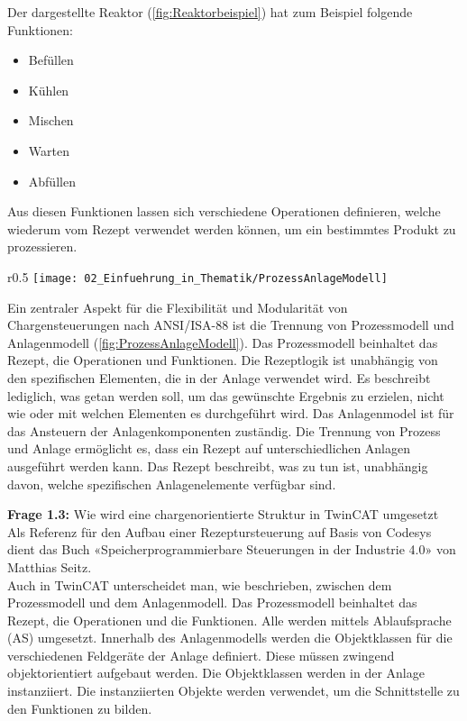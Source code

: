 		Der dargestellte Reaktor (\ref{fig:Reaktorbeispiel}) hat zum Beispiel folgende Funktionen:
		\begin{itemize}
			\item Befüllen
			\item Kühlen
			\item Mischen
			\item Warten
			\item Abfüllen
		\end{itemize}
		\addvspace{5mm} 
		
		Aus diesen Funktionen lassen sich verschiedene Operationen definieren, welche wiederum vom Rezept verwendet werden können, um ein bestimmtes Produkt zu prozessieren. 
		\begin{wrapfigure}{r}{0.5\textwidth}
			\centering
			\texttt{[image: 02\_Einfuehrung\_in\_Thematik/ProzessAnlageModell]}
			\captionsetup{justification=centering}
			\caption{Prozess- und Anlagenmodell}
			\label{fig:ProzessAnlageModell}
		\end{wrapfigure}
		Ein zentraler Aspekt für die Flexibilität und Modularität von Chargensteuerungen nach ANSI/ISA-88 ist die Trennung von Prozessmodell und Anlagenmodell (\ref{fig:ProzessAnlageModell}). Das Prozessmodell beinhaltet das Rezept, die Operationen und Funktionen. Die Rezeptlogik ist unabhängig von den spezifischen Elementen, die in der Anlage verwendet wird. Es beschreibt lediglich, was getan werden soll, um das gewünschte Ergebnis zu erzielen, nicht wie oder mit welchen Elementen es durchgeführt wird. Das Anlagenmodel ist für das Ansteuern der Anlagenkomponenten zuständig. Die Trennung von Prozess und Anlage ermöglicht es, dass ein Rezept auf unterschiedlichen Anlagen ausgeführt werden kann. Das Rezept beschreibt, was zu tun ist, unabhängig davon, welche spezifischen Anlagenelemente verfügbar sind.
		
	\vspace{3mm}
	
	\textbf{Frage 1.3:} Wie wird eine chargenorientierte Struktur in TwinCAT umgesetzt \vspace{2mm} 
	\\
		Als Referenz für den Aufbau einer Rezeptursteuerung auf Basis von Codesys dient das Buch «Speicherprogrammierbare Steuerungen in der Industrie 4.0» von Matthias Seitz.
		\\
		Auch in TwinCAT unterscheidet man, wie beschrieben, zwischen dem Prozessmodell und dem Anlagenmodell. Das Prozessmodell beinhaltet das Rezept, die Operationen und die Funktionen. Alle werden mittels Ablaufsprache (AS) umgesetzt. Innerhalb des Anlagenmodells werden die Objektklassen für die verschiedenen Feldgeräte der Anlage definiert. Diese müssen zwingend objektorientiert aufgebaut werden. Die Objektklassen werden in der Anlage instanziiert. Die instanziierten Objekte werden verwendet, um die Schnittstelle zu den Funktionen zu bilden. 
		
